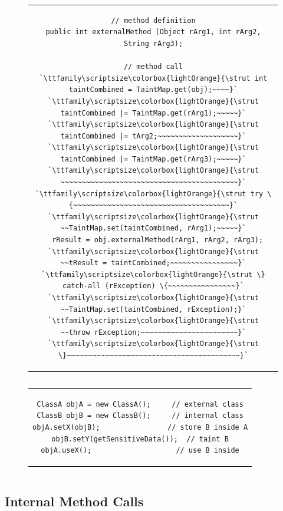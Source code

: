\documentclass[12pt,twoside,notitlepage]{report}
\newcommand{\highlight}[1]{\colorbox{lightOrange}{\strut #1}}
\newcommand{\lsthl}[1] {\ttfamily\scriptsize\highlight{#1}}
\begin{document}
\begin{figure}
	\centering
	\begin{tabular}{c}
	\begin{lstlisting}
// method definition
public int externalMethod (Object rArg1, int rArg2, String rArg3);

// method call
`\lsthl{int taintCombined = TaintMap.get(obj);~~~~}`
`\lsthl{taintCombined |= TaintMap.get(rArg1);~~~~~}`
`\lsthl{taintCombined |= tArg2;~~~~~~~~~~~~~~~~~~~}`
`\lsthl{taintCombined |= TaintMap.get(rArg3);~~~~~}`
`\lsthl{~~~~~~~~~~~~~~~~~~~~~~~~~~~~~~~~~~~~~~~~~~}`
`\lsthl{try \{~~~~~~~~~~~~~~~~~~~~~~~~~~~~~~~~~~~~~}`
`\lsthl{~~TaintMap.set(taintCombined, rArg1);~~~~~}`
  rResult = obj.externalMethod(rArg1, rArg2, rArg3);
`\lsthl{~~tResult = taintCombined;~~~~~~~~~~~~~~~~}`
`\lsthl{\} catch-all (rException) \{~~~~~~~~~~~~~~~~}`
`\lsthl{~~TaintMap.set(taintCombined, rException);}`
`\lsthl{~~throw rException;~~~~~~~~~~~~~~~~~~~~~~~}`
`\lsthl{\}~~~~~~~~~~~~~~~~~~~~~~~~~~~~~~~~~~~~~~~~~}`
	\end{lstlisting}
	\end{tabular}
	\begin{lstlisting}[caption={Instrumentation of external method calls. The second and third arguments do not inherit combined taint because they are immutable.},
	                   label={listing:TaintPropagation_ExternalMethodCall}]
	\end{lstlisting}
\end{figure}

\begin{figure}
	\centering
	\begin{tabular}{c}
	\begin{lstlisting}
ClassA objA = new ClassA();     // external class
ClassB objB = new ClassB();     // internal class
objA.setX(objB);                // store B inside A
objB.setY(getSensitiveData());  // taint B
objA.useX();                    // use B inside
	\end{lstlisting}
	\end{tabular}
	\begin{lstlisting}[caption={Example of a propagation logic hole},
	                   label={listing:ExternalMethodCalls_LogicHole}]
	\end{lstlisting}
\end{figure}

\subsection{Internal Method Calls}
\label{section:TaintPropagation_MethodCalls_Internal}
\end{document}
